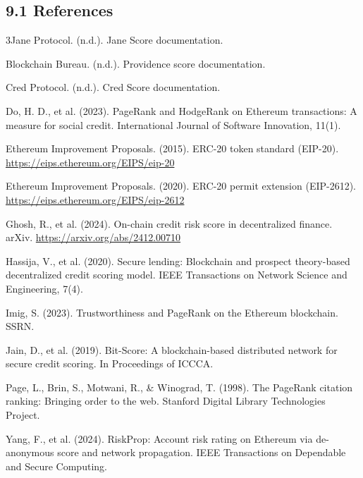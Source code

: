 \subsection*{9.1 References}
\label{sec:references}

\hangindent=0.5in  3Jane Protocol. (n.d.). Jane Score documentation.\par

\hangindent=0.5in  Blockchain Bureau. (n.d.). Providence score documentation.\par

\hangindent=0.5in  Cred Protocol. (n.d.). Cred Score documentation.\par

\hangindent=0.5in  Do, H. D., et al. (2023). PageRank and HodgeRank on Ethereum transactions: A measure for social credit. International Journal of Software Innovation, 11(1).\par

\hangindent=0.5in  Ethereum Improvement Proposals. (2015). ERC-20 token standard (EIP-20). \href{https://eips.ethereum.org/EIPS/eip-20}{https://eips.ethereum.org/EIPS/eip-20}\par

\hangindent=0.5in  Ethereum Improvement Proposals. (2020). ERC-20 permit extension (EIP-2612). \href{https://eips.ethereum.org/EIPS/eip-2612}{https://eips.ethereum.org/EIPS/eip-2612}\par

\hangindent=0.5in  Ghosh, R., et al. (2024). On-chain credit risk score in decentralized finance. arXiv. \href{https://arxiv.org/abs/2412.00710}{https://arxiv.org/abs/2412.00710}\par

\hangindent=0.5in  Hassija, V., et al. (2020). Secure lending: Blockchain and prospect theory-based decentralized credit scoring model. IEEE Transactions on Network Science and Engineering, 7(4).\par

\hangindent=0.5in  Imig, S. (2023). Trustworthiness and PageRank on the Ethereum blockchain. SSRN.\par

\hangindent=0.5in  Jain, D., et al. (2019). Bit-Score: A blockchain-based distributed network for secure credit scoring. In Proceedings of ICCCA.\par

\hangindent=0.5in  Page, L., Brin, S., Motwani, R., \& Winograd, T. (1998). The PageRank citation ranking: Bringing order to the web. Stanford Digital Library Technologies Project.\par

\hangindent=0.5in  Yang, F., et al. (2024). RiskProp: Account risk rating on Ethereum via de-anonymous score and network propagation. IEEE Transactions on Dependable and Secure Computing.\par
